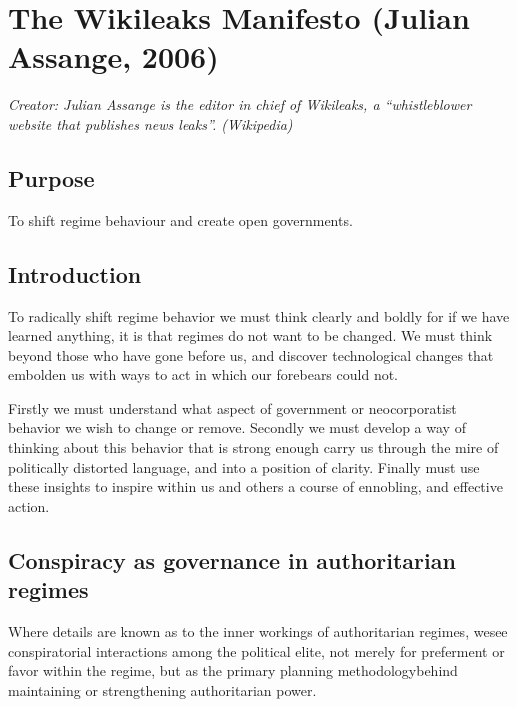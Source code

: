 \documentclass[letterpaper,12pt,english]{sphinxmanual}
\begin{document}

\chapter{The Wikileaks Manifesto (Julian Assange, 2006)}
\label{assange::doc}\label{assange:index-0}\label{assange:the-wikileaks-manifesto-julian-assange-2006}
\emph{Creator: Julian Assange is the editor in chief of Wikileaks, a “whistleblower website that publishes news leaks”. (Wikipedia)}


\section{Purpose}
\label{assange:purpose}
To shift regime behaviour and create open governments.


\section{Introduction}
\label{assange:introduction}
To radically shift regime behavior we must think clearly and boldly for if we have learned anything, it is that regimes do not want to be changed. We must think beyond those who have gone before us, and discover technological changes that embolden us with ways to act in which our forebears could not.

Firstly we must understand what aspect of government or neocorporatist behavior we wish to change or remove. Secondly we must develop a way of thinking about this behavior that is strong enough carry us through the mire of politically distorted language, and into a position of clarity. Finally must use these insights to inspire within us and others a course of ennobling, and effective action.


\section{Conspiracy as governance in authoritarian regimes}
\label{assange:conspiracy-as-governance-in-authoritarian-regimes}
Where details are known as to the inner workings of authoritarian regimes, wesee conspiratorial interactions among the political elite, not merely for preferment or favor within the regime, but as the primary planning methodologybehind maintaining or strengthening authoritarian power.
\end{document}
